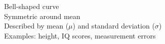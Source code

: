\documentclass[preview]{standalone}
\begin{document}
Bell-shaped curve\\Symmetric around mean\\Described by mean ($\mu$) and standard deviation ($\sigma$)\\Examples: height, IQ scores, measurement errors\\
\end{document}
